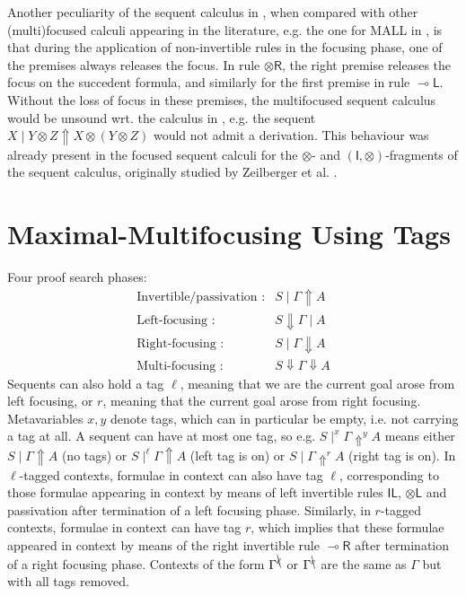 \documentclass[runningheads]{llncs}
\newcommand{\tl}{\otimes \mathsf{L}}
\newcommand{\tr}{\otimes \mathsf{R}}
\newcommand{\lright}{{\multimap}\mathsf{R}}
\newcommand{\lleft}{{\multimap}\mathsf{L}}
\newcommand{\unitl}{\mathsf{IL}}
\newcommand{\otL}{\tl}
\newcommand{\otR}{\tr}
\newcommand{\lolliR}{\lright}
\newcommand{\lolliL}{\lleft}
\newcommand{\IL}{\unitl}
\newcommand{\ot}{\otimes}
\newcommand{\I}{\mathsf{I}}
\newcommand{\up}{\Uparrow}
\newcommand{\dn}{\Downarrow}
\begin{document}
Another peculiarity of the sequent calculus in , when compared with other (multi)focused calculi appearing in the literature, e.g. the one for MALL in \cite{chaudhuri:canonical:2008}, is that during the application of non-invertible rules in the focusing phase, one of the premises always releases the focus. In rule $\otR$, the right premise releases the focus on the succedent formula, and similarly for the  first premise in rule $\lolliL$. Without the loss of focus in these premises, the multifocused sequent calculus would be unsound wrt. the calculus in , e.g. the sequent $X \mid Y  \ot Z \up X \ot (Y \ot Z)$ would not admit a derivation. This behaviour was already present in the focused sequent calculi for the $\ot$- and $(\I,\ot)$-fragments of the sequent calculus, originally studied by Zeilberger et al. \cite{zeilberger:semiassociative:19,uustalu:sequent:2021}.


\section{Maximal-Multifocusing Using Tags}\label{sec:maxfocus}

Four proof search phases:
\[
\begin{array}{rl}
  \text{Invertible/passivation :} &  S \mid \Gamma \up A \\
  \text{Left-focusing :} &  S \dn \Gamma \mid A \\
  \text{Right-focusing :} &  S \mid \Gamma \dn A \\
  \text{Multi-focusing :} &  S \dn \Gamma \dn A
\end{array}
\]
Sequents can also hold a tag $\ell$, meaning that we are the current goal arose from left focusing, or $r$, meaning that the current goal arose from right focusing. Metavariables $x,y$  denote tags, which can in particular be empty, i.e. not carrying a tag at all. A sequent can have at most one tag, so e.g. $S \mid^x \Gamma \up^y A$ means either $S \mid \Gamma \up A$ (no tags) or $S \mid^\ell \Gamma \up A$ (left tag is on) or $S \mid \Gamma \up^r A$ (right tag is on). In $\ell$-tagged contexts, formulae in context can also have tag $\ell$, corresponding to those formulae appearing in context by means of left invertible rules $\IL$, $\otL$ and passivation after termination of a left focusing phase. Similarly, in $r$-tagged contexts, formulae in context can have tag $r$, which implies that these formulae appeared in context by means of the right invertible rule $\lolliR$ after termination of a right focusing phase. Contexts of the form $\Gamma^{\bcancel{\ell}}$ or $\Gamma^{\bcancel{r}}$ are the same as $\Gamma$ but with all tags removed.
\end{document}

